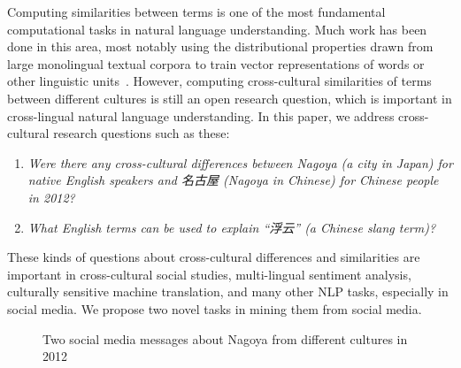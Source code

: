 Computing similarities between terms is one of the most fundamental
computational tasks in natural language understanding. 
Much work has been done in this area, most notably using the distributional properties drawn from large monolingual textual corpora to train vector representations of words or other linguistic units~\cite{pennington2014glove,Le2014DistributedRO}. 
However, computing cross-cultural similarities of terms between different cultures is still an open research question, which is important in cross-lingual natural language understanding.
In this paper, we address cross-cultural research questions such as these:
\begin{enumerate}
\item {\em Were there any cross-cultural differences between Nagoya (a city in Japan) for native English speakers and 名古屋 (Nagoya in Chinese) for Chinese people in 2012?}
\item {\em What English terms can be used to explain ``浮云'' (a Chinese slang term)?}
\end{enumerate}
These kinds of questions about cross-cultural differences and similarities are important in cross-cultural social studies, multi-lingual sentiment analysis, culturally sensitive machine translation, and many other NLP tasks, especially in social media.
We propose two novel tasks in mining them from social media.
\begin{figure}[t]
	\centering
	\caption{Two social media messages about Nagoya from different cultures in 2012 }
	\label{fig:intro}
\end{figure}

